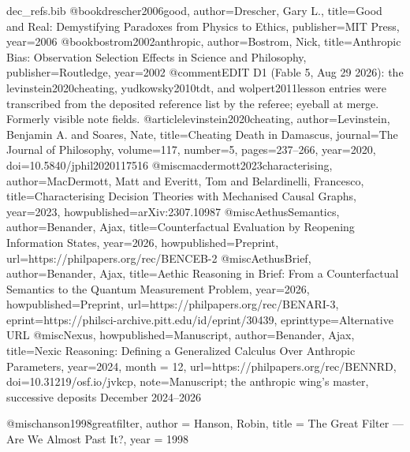 
\begin{filecontents}[overwrite]{dec_refs.bib}
@book{drescher2006good, author={Drescher, Gary L.}, title={Good and Real: Demystifying Paradoxes from Physics to Ethics}, publisher={MIT Press}, year={2006}}
@book{bostrom2002anthropic, author={Bostrom, Nick}, title={Anthropic Bias: Observation Selection Effects in Science and Philosophy}, publisher={Routledge}, year={2002}}
@comment{EDIT D1 (Fable 5, Aug 29 2026): the levinstein2020cheating, yudkowsky2010tdt, and wolpert2011lesson entries were transcribed from the deposited reference list by the referee; eyeball at merge. Formerly visible note fields.}
@article{levinstein2020cheating, author={Levinstein, Benjamin A. and Soares, Nate}, title={Cheating Death in Damascus}, journal={The Journal of Philosophy}, volume={117}, number={5}, pages={237--266}, year={2020}, doi={10.5840/jphil2020117516}}
@misc{macdermott2023characterising, author={MacDermott, Matt and Everitt, Tom and Belardinelli, Francesco}, title={Characterising Decision Theories with Mechanised Causal Graphs}, year={2023}, howpublished={arXiv:2307.10987}}
@misc{AethusSemantics, author={Benander, Ajax}, title={Counterfactual Evaluation by Reopening Information States}, year={2026}, howpublished={Preprint}, url={https://philpapers.org/rec/BENCEB-2}}
@misc{AethusBrief, author={Benander, Ajax}, title={Aethic Reasoning in Brief: From a Counterfactual Semantics to the Quantum Measurement Problem}, year={2026}, howpublished={Preprint}, url={https://philpapers.org/rec/BENARI-3}, eprint={https://philsci-archive.pitt.edu/id/eprint/30439}, eprinttype={Alternative URL}}
@misc{Nexus, howpublished={Manuscript}, author={Benander, Ajax}, title={Nexic Reasoning: Defining a Generalized Calculus Over Anthropic Parameters}, year={2024}, month = {12}, url={https://philpapers.org/rec/BENNRD}, doi={10.31219/osf.io/jvkcp}, note={Manuscript; the anthropic wing's master, successive deposits December 2024--2026}}



@misc{hanson1998greatfilter,
  author = {Hanson, Robin},
  title  = {The Great Filter --- Are We Almost Past It?},
  year   = {1998}
}


\end{filecontents}
